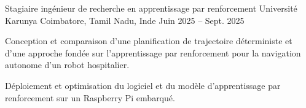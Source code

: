 \begin{cventries}
  \cventry
    {Stagiaire ingénieur de recherche en apprentissage par renforcement}
    {Université Karunya}
    {Coimbatore, Tamil Nadu, Inde}
    {Juin 2025 -- Sept. 2025}
    {
      \begin{cvitems}
        \item {Conception et comparaison d’une planification de trajectoire déterministe et d’une approche fondée sur l’apprentissage par renforcement pour la navigation autonome d’un robot hospitalier.}
        \item {Déploiement et optimisation du logiciel et du modèle d’apprentissage par renforcement sur un Raspberry Pi embarqué.}
      \end{cvitems}
    }
\end{cventries}
